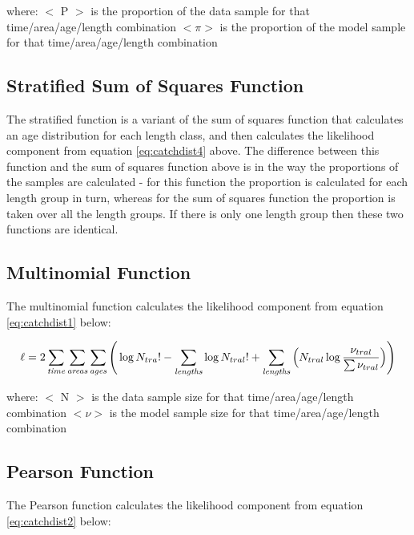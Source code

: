 \documentclass[]{book}
\begin{document}
where: \(<\) P \(>\) is the proportion of the data sample for that
time/area/age/length combination \(<\pi>\) is the proportion of the model
sample for that time/area/age/length combination

\hypertarget{stratified-sum-of-squares-function}{%
\subsection{Stratified Sum of Squares Function}\label{stratified-sum-of-squares-function}}

The stratified function is a variant of the sum of squares function that
calculates an age distribution for each length class, and then
calculates the likelihood component from
equation \eqref{eq:catchdist4} above. The difference between this function
and the sum of squares function above is in the way the proportions of
the samples are calculated - for this function the proportion is
calculated for each length group in turn, whereas for the sum of squares
function the proportion is taken over all the length groups. If there is
only one length group then these two functions are identical.

\hypertarget{multinomial-function}{%
\subsection{Multinomial Function}\label{multinomial-function}}

The multinomial function calculates the likelihood component from
equation \eqref{eq:catchdist1} below:

\begin{equation}
\label{eq:catchdist1}
\ell = 2 \sum_{\it time}\sum_{\it areas}\sum_{\it ages} \Bigg( \log N_{tra}! - \sum_{\it lengths} \log N_{tral}! + \sum_{\it lengths} \Big( N_{tral} \log {\frac{\nu_{tral}}{\sum \nu_{tral}}} \Big) \Bigg)\end{equation}

where: \(<\) N \(>\) is the data sample size for that time/area/age/length
combination \(<\nu>\) is the model sample size for that
time/area/age/length combination

\hypertarget{pearson-function}{%
\subsection{Pearson Function}\label{pearson-function}}

The Pearson function calculates the likelihood component from
equation \eqref{eq:catchdist2} below:
\end{document}
